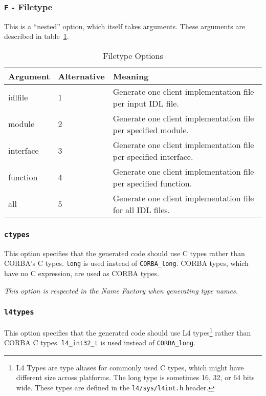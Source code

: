 \subsubsection{{\tt F} - Filetype}
This is a ``nested'' option, which itself takes arguments. These arguments
are described in table~\ref{tab:filetype}.

\begin{table}[htb]
\begin{center}
\begin{tabular}{|l|l|p{6cm}|} \hline
Argument & Alternative & Meaning \\ \hline \hline
idlfile & 1 & Generate one client implementation file per input IDL file. \\ \hline
module & 2 & Generate one client implementation file per specified module. \\ \hline
interface & 3 & Generate one client implementation file per specified interface. \\ \hline
function & 4 & Generate one client implementation file per specified function. \\ \hline
all & 5 & Generate one client implementation file for all IDL files. \\ \hline
\end{tabular}
\caption{\label{tab:filetype} Filetype Options}
\end{center}
\end{table}

\subsubsection{{\tt ctypes}}
This option specifies that the generated code should use C types rather than
CORBA's C types. \verb|long| is used instead of \verb|CORBA_long|.
CORBA types, which have no C expression, are used as CORBA types.

{\it This option is respected in the Name Factory when generating type names.}

\subsubsection{{\tt l4types}}
This option specifies that the generated code should use L4 types\footnote{L4 Types
are type aliases for commonly used C types, which might have different size across
platforms. The long type is sometimes 16, 32, or 64 bits wide. These types are defined
in the {\tt l4/sys/l4int.h} header.} rather than
CORBA C types. \verb|l4_int32_t| is used instead of \verb|CORBA_long|.

